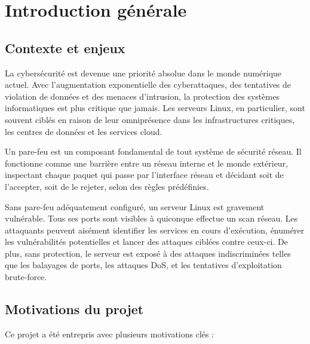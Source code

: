\chapter{Introduction générale}

\section{Contexte et enjeux}

La cybersécurité est devenue une priorité absolue dans le monde numérique actuel. Avec l'augmentation exponentielle des cyberattaques, des tentatives de violation de données et des menaces d'intrusion, la protection des systèmes informatiques est plus critique que jamais. Les serveurs Linux, en particulier, sont souvent ciblés en raison de leur omniprésence dans les infrastructures critiques, les centres de données et les services cloud.

Un pare-feu est un composant fondamental de tout système de sécurité réseau. Il fonctionne comme une barrière entre un réseau interne et le monde extérieur, inspectant chaque paquet qui passe par l'interface réseau et décidant soit de l'accepter, soit de le rejeter, selon des règles prédéfinies.

Sans pare-feu adéquatement configuré, un serveur Linux est gravement vulnérable. Tous ses ports sont visibles à quiconque effectue un scan réseau. Les attaquants peuvent aisément identifier les services en cours d'exécution, énumérer les vulnérabilités potentielles et lancer des attaques ciblées contre ceux-ci. De plus, sans protection, le serveur est exposé à des attaques indiscriminées telles que les balayages de ports, les attaques DoS, et les tentatives d'exploitation brute-force.

\section{Motivations du projet}

Ce projet a été entrepris avec plusieurs motivations clés :

